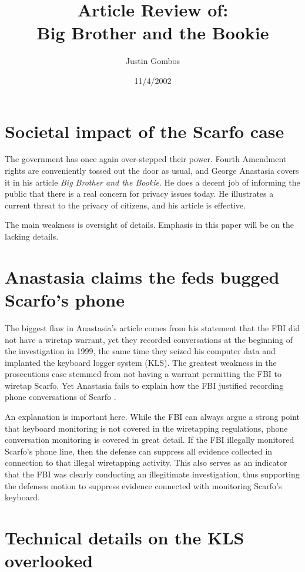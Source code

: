 \documentclass[12pt,titlepage]{article}             %
\title{Article Review of:\\Big Brother and the Bookie}
\author{Justin Gombos}
\date{11/4/2002}
\begin{document}
  \maketitle
  \baselineskip=19pt

  \section{Societal impact of the Scarfo case}
  
  The government has once again over-stepped their power.  Fourth
  Amendment rights are conveniently tossed out the door as usual, and
  George Anastasia covers it in his article \textit{Big Brother and
    the Bookie}.  He does a decent job of informing the public that
  there is a real concern for privacy issues today.  He illustrates a
  current threat to the privacy of citizens, and his article is
  effective.
  
  The main weakness is oversight of details.  Emphasis in this paper
  will be on the lacking details.

  \section{Anastasia claims the feds bugged Scarfo's phone}
  
  The biggest flaw in Anastasia's article comes from his statement
  that the FBI did not have a wiretap warrant, yet they recorded
  conversations at the beginning of the investigation in 1999, the
  same time they seized his computer data and implanted the keyboard
  logger system (KLS).  The greatest weakness in the prosecutions case
  stemmed from not having a warrant permitting the FBI to wiretap
  Scarfo.  Yet Anastasia fails to explain how the FBI justified
  recording phone conversations of Scarfo \cite{ANASTASIA}.
  
  An explanation is important here.  While the FBI can always argue a
  strong point that keyboard monitoring is not covered in the
  wiretapping regulations, phone conversation monitoring is covered in
  great detail.  If the FBI illegally monitored Scarfo's phone line,
  then the defense can suppress all evidence collected in connection
  to that illegal wiretapping activity.  This also serves as an
  indicator that the FBI was clearly conducting an illegitimate
  investigation, thus supporting the defenses motion to suppress
  evidence connected with monitoring Scarfo's keyboard.

  \section{Technical details on the KLS overlooked}
  
\end{document}
